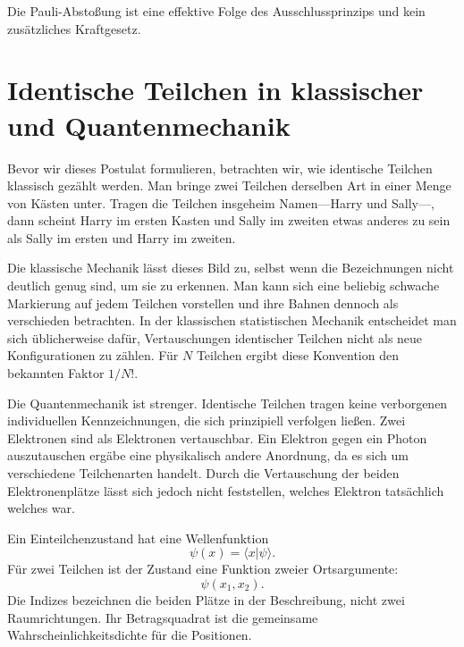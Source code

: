 Die Pauli-Abstoßung ist eine effektive Folge des Ausschlussprinzips und kein zusätzliches Kraftgesetz.

\begin{classroomqa}
\end{classroomqa}

\section{Identische Teilchen in klassischer und Quantenmechanik}

Bevor wir dieses Postulat formulieren, betrachten wir, wie identische Teilchen klassisch gezählt werden. Man bringe zwei Teilchen derselben Art in einer Menge von Kästen unter. Tragen die Teilchen insgeheim Namen---Harry und Sally---, dann scheint Harry im ersten Kasten und Sally im zweiten etwas anderes zu sein als Sally im ersten und Harry im zweiten.

Die klassische Mechanik lässt dieses Bild zu, selbst wenn die Bezeichnungen nicht deutlich genug sind, um sie zu erkennen. Man kann sich eine beliebig schwache Markierung auf jedem Teilchen vorstellen und ihre Bahnen dennoch als verschieden betrachten. In der klassischen statistischen Mechanik entscheidet man sich üblicherweise dafür, Vertauschungen identischer Teilchen nicht als neue Konfigurationen zu zählen. Für \(N\) Teilchen ergibt diese Konvention den bekannten Faktor \(1/N!\).

Die Quantenmechanik ist strenger. Identische Teilchen tragen keine verborgenen individuellen Kennzeichnungen, die sich prinzipiell verfolgen ließen. Zwei Elektronen sind als Elektronen vertauschbar. Ein Elektron gegen ein Photon auszutauschen ergäbe eine physikalisch andere Anordnung, da es sich um verschiedene Teilchenarten handelt. Durch die Vertauschung der beiden Elektronenplätze lässt sich jedoch nicht feststellen, welches Elektron tatsächlich welches war.

Ein Einteilchenzustand hat eine Wellenfunktion
\[
\psi(x)=\langle x\vert\psi\rangle.
\]
Für zwei Teilchen ist der Zustand eine Funktion zweier Ortsargumente:
\begin{equation}
\psi(x_{1},x_{2}).
\end{equation}
Die Indizes bezeichnen die beiden Plätze in der Beschreibung, nicht zwei Raumrichtungen. Ihr Betragsquadrat ist die gemeinsame Wahrscheinlichkeitsdichte für die Positionen.

